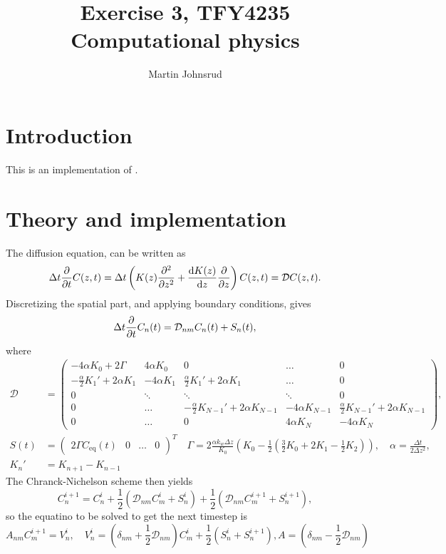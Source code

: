 \documentclass{article}
\title{Exercise 3, TFY4235 Computational physics}
\author{Martin Johnsrud}
\date{}
\begin{document}
    \maketitle
    \section*{Introduction}
        This is an implementation of \cite{exercise}.
    \section*{Theory and implementation}
    The diffusion equation, can be written as
    \begin{equation*}
        \Delta t \pdv{t} C(z, t) = \Delta t \left(K(z) \pdv[2]{z} + \dv{K(z)}{z}\pdv{z}\right) C(z, t) = \mathcal{D} C(z, t).
    \end{equation*}
    Discretizing the spatial part, and applying boundary conditions, gives
    \begin{equation*}
        \Delta t \pdv{t} C_n(t) = \mathcal{D}_{nm} C_n(t) + S_n(t),
    \end{equation*}
    where 
    \begin{align*}
        \mathcal{D} &=
        \begin{pmatrix}
            -4\alpha K_0 + 2\Gamma & 4\alpha K_0 & 0 & \dots&0 \\
            -\frac{\alpha}{2} K_1' + 2\alpha K_1 & -4 \alpha K_1 & \frac{\alpha}{2}K_1' + 2\alpha K_1 &  \dots & 0 \\
            0 & \ddots & \ddots & \ddots & 0\\
            0 & \dots &-\frac{\alpha}{2} K_{N-1}' + 2\alpha K_{N-1} & -4 \alpha K_{N-1} & \frac{\alpha}{2}K_{N-1}' + 2\alpha K_{N-1} \\
             0 & \dots & 0 & 4\alpha K_N & -4\alpha K_N
        \end{pmatrix},\\
        S(t) & = 
        \begin{pmatrix}
            2\Gamma C_\mathrm{eq}(t) &0&\dots&0
        \end{pmatrix}^T \quad 
    \Gamma = 2 \frac{\alpha k_w \Delta z}{K_0} \left(K_0 - \frac{1}{2}(\frac{3}{2} K_0 + 2K_1 - \frac{1}{2}K_2)\right), \quad
     \alpha = \frac{\Delta t}{2 \Delta z^2 },\\
      K_n' & = K_{n+1} - K_{n-1}
    \end{align*}
    The Chranck-Nichelson scheme then yields
    \begin{equation*}
        C_n^{i+1}  = C_n^i + \frac{1}{2} (\mathcal{D}_{nm} C_m^i + S_n^i) + \frac{1}{2} (\mathcal{D}_{nm} C_m^{i+1} + S_n^{i+1}),
    \end{equation*}
    so the equatino to be solved to get the next timestep is
    \begin{equation*}
        A_{nm} C_{m}^{i+1} = V_n^i, \quad V_n^i = \left(\delta_{nm} + \frac{1}{2} \mathcal{D}_{nm}\right) C_m^i + \frac{1}{2}(S_n^i + S_n^{i+1}), A = \left(\delta_{nm} - \frac{1}{2} \mathcal{D}_{nm}\right)
    \end{equation*}
    
    
\end{document}
